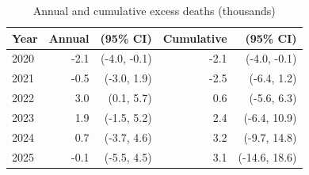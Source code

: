 \begin{table}[ht]
\centering
\caption{Annual and cumulative excess deaths (thousands)} 
\label{tab:annual_cumulative}
\begin{tabular}{lrrrr}
  \hline
Year & Annual & (95\% CI) & Cumulative & (95\% CI) \\ 
  \hline
2020 & -2.1 & (-4.0, -0.1) & -2.1 & (-4.0, -0.1) \\ 
  2021 & -0.5 & (-3.0, 1.9) & -2.5 & (-6.4, 1.2) \\ 
  2022 & 3.0 & (0.1, 5.7) & 0.6 & (-5.6, 6.3) \\ 
  2023 & 1.9 & (-1.5, 5.2) & 2.4 & (-6.4, 10.9) \\ 
  2024 & 0.7 & (-3.7, 4.6) & 3.2 & (-9.7, 14.8) \\ 
  2025 & -0.1 & (-5.5, 4.5) & 3.1 & (-14.6, 18.6) \\ 
   \hline
\end{tabular}
\end{table}
